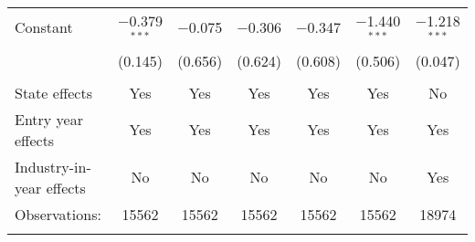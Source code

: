 \begin{tabular}{@{\extracolsep{5pt}}lcccccc}
 Constant & $-$0.379$^{***}$ & $-$0.075 & $-$0.306 & $-$0.347 & $-$1.440$^{***}$ & $-$1.218$^{***}$ \\ 
  & (0.145) & (0.656) & (0.624) & (0.608) & (0.506) & (0.047) \\ 
  & & & & & & \\ 
State effects & Yes & Yes & Yes & Yes & Yes & No \\ 
Entry year effects & Yes & Yes & Yes & Yes & Yes & Yes \\ 
Industry-in-year effects & No & No & No & No & No & Yes \\ 
Observations: & 15562 & 15562 & 15562 & 15562 & 15562 & 18974 \\ 
\hline \\[-1.8ex] 
\end{tabular} 
\endgroup 
